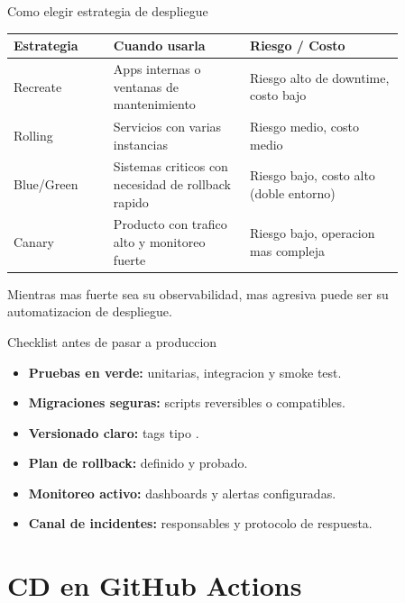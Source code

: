 \documentclass[aspectratio=169]{beamer}
\begin{document}
\begin{frame}{Como elegir estrategia de despliegue}
	\small
	\renewcommand{\arraystretch}{1.25}
	\begin{tabular}{|p{0.22\linewidth}|p{0.30\linewidth}|p{0.34\linewidth}|}
		\hline
		\rowcolor{gludOrangeDark!85}
		\textbf{Estrategia} & \textbf{Cuando usarla} & \textbf{Riesgo / Costo} \\
		\hline
		Recreate & Apps internas o ventanas de mantenimiento & Riesgo alto de downtime, costo bajo \\
		\hline
		Rolling & Servicios con varias instancias & Riesgo medio, costo medio \\
		\hline
		Blue/Green & Sistemas criticos con necesidad de rollback rapido & Riesgo bajo, costo alto (doble entorno) \\
		\hline
		Canary & Producto con trafico alto y monitoreo fuerte & Riesgo bajo, operacion mas compleja \\
		\hline
	\end{tabular}

	\vspace{0.1cm}
	\begin{darkbox}
		Mientras mas fuerte sea su observabilidad, mas agresiva puede ser su automatizacion de despliegue.
	\end{darkbox}
\end{frame}

\begin{frame}{Checklist antes de pasar a produccion}
	\begin{itemize}
		\item \textbf{Pruebas en verde:} unitarias, integracion y smoke test.
		\item \textbf{Migraciones seguras:} scripts reversibles o compatibles.
		\item \textbf{Versionado claro:} tags tipo .
		\item \textbf{Plan de rollback:} definido y probado.
		\item \textbf{Monitoreo activo:} dashboards y alertas configuradas.
		\item \textbf{Canal de incidentes:} responsables y protocolo de respuesta.
	\end{itemize}
\end{frame}

\section{CD en GitHub Actions}
\end{document}
